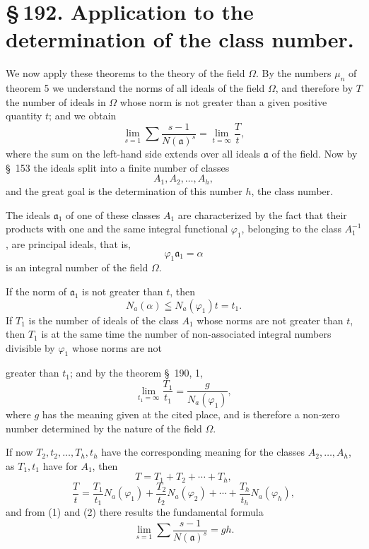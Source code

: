\documentclass[11pt]{article}
\begin{document}
\section*{\S\,192. Application to the determination of the class number.}

We now apply these theorems to the theory of the field $\Omega$. By the numbers $\mu_n$ of theorem 5 we understand the norms of all ideals of the field $\Omega$, and therefore by $T$ the number of ideals in $\Omega$ whose norm is not greater than a given positive quantity $t$; and we obtain
\begin{equation}
\lim_{s=1}\sum\frac{s-1}{N(\mathfrak a)^s}=\lim_{t=\infty}\frac{T}{t},
\tag{1}
\end{equation}
where the sum on the left-hand side extends over all ideals $\mathfrak a$ of the field. Now by \S~153 the ideals split into a finite number of classes
\[
A_1,A_2,\ldots,A_h,
\]
and the great goal is the determination of this number $h$, the class number.

The ideals $\mathfrak a_1$ of one of these classes $A_1$ are characterized by the fact that their products with one and the same integral functional $\varphi_1$, belonging to the class $A_1^{-1}$, are principal ideals, that is,
\[
\varphi_1\mathfrak a_1=\alpha
\]
is an integral number of the field $\Omega$.

If the norm of $\mathfrak a_1$ is not greater than $t$, then
\[
N_a(\alpha)\leqq N_a(\varphi_1)t=t_1.
\]
If $T_1$ is the number of ideals of the class $A_1$ whose norms are not greater than $t$, then $T_1$ is at the same time the number of non-associated integral numbers divisible by $\varphi_1$ whose norms are not

greater than $t_1$; and by the theorem \S~190, 1,
\begin{equation}
\lim_{t_1=\infty}\frac{T_1}{t_1}=\frac{g}{N_a(\varphi_1)},
\tag{2}
\end{equation}
where $g$ has the meaning given at the cited place, and is therefore a non-zero number determined by the nature of the field $\Omega$.

If now $T_2,t_2,\ldots,T_h,t_h$ have the corresponding meaning for the classes $A_2,\ldots,A_h$, as $T_1,t_1$ have for $A_1$, then
\[
T=T_1+T_2+\cdots+T_h,
\]
\[
\frac{T}{t}=\frac{T_1}{t_1}N_a(\varphi_1)+\frac{T_2}{t_2}N_a(\varphi_2)+\cdots+
\frac{T_h}{t_h}N_a(\varphi_h),
\]
and from (1) and (2) there results the fundamental formula
\begin{equation}
\lim_{s=1}\sum\frac{s-1}{N(\mathfrak a)^s}=gh.
\tag{3}
\end{equation}
\end{document}
